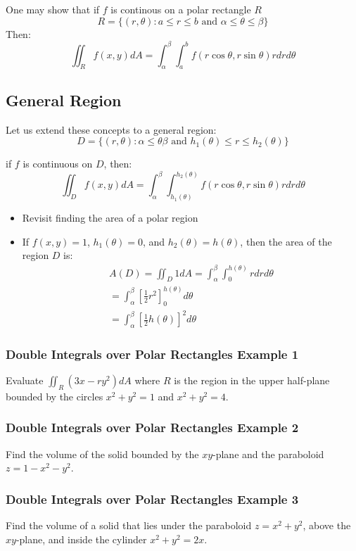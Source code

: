 \documentclass[12pt]{article}
\begin{document}
One may show that if \(f\) is continous on a polar rectangle \(R\)
\[
	R = \{(r,\theta): a\leq r \leq b \text{ and } \alpha \leq \theta \leq \beta \} 
\]
Then:
\[
	\iint_{R}f(x,y)dA = \int_{\alpha}^{\beta} \int_{a}^{b} f(r\cos\theta, r\sin\theta)rdrd\theta
\]

\subsection{General Region}
Let us extend these concepts to a general region:
\[
	D = \{(r,\theta):\alpha \leq \theta \beta \text{ and } h_1(\theta) \leq r \leq h_2(\theta)\}
\]

if \(f\) is continuous on \(D\), then: \[
	\iint_{D}f(x,y)dA = \int_{\alpha}^{\beta} \int_{h_1(\theta)}^{h_2(\theta)} f(r\cos\theta, r\sin \theta) rdrd\theta
\]

\begin{itemize}
	\item Revisit finding the area of a polar region
	\item If \(f(x,y) = 1\), \(h_1(\theta) = 0\), and \(h_2(\theta) = h(\theta)\), then the area of the region \(D\) is:
		\begin{align*}
			A(D) = \iint_{D}1dA = \int_{\alpha}^{\beta} \int_{0}^{h(\theta)} rdrd\theta\\
			= \int_{\alpha}^{\beta} [\frac{1}{2}r^2]^{h(\theta)}_0 d\theta \\
			= \int_{\alpha}^{\beta} [\frac{1}{2}h(\theta)]^2 d\theta
		\end{align*}
\end{itemize}
\subsubsection{Double Integrals over Polar Rectangles Example 1} 
Evaluate \(\iint_{R}(3x - ry^2)dA\) where \(R\) is the region in the upper half-plane bounded by the circles \(x^2 + y^2 = 1\) and \(x^2 + y^2 = 4\).

\subsubsection{Double Integrals over Polar Rectangles Example 2}
Find the volume of the solid bounded by the \(xy\)-plane and the paraboloid \(z = 1-x^2 -y^2\).

\subsubsection{Double Integrals over Polar Rectangles Example 3}
Find the volume of a solid that lies under the paraboloid \(z=x^2 + y^2\), above the \(xy\)-plane, and inside the cylinder \(x^2 + y^2 = 2x\).
\end{document}
